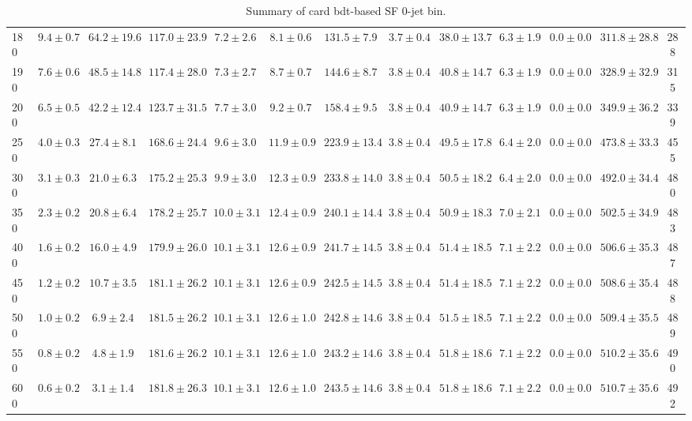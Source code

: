 \begin{table}
{\begin{center}
\begin{tabular}{l | c c | c c c c c c c c  | c c}
180 & $9.4\pm0.7$ & $64.2\pm19.6$ & $117.0\pm23.9$ & $7.2\pm2.6$ & $8.1\pm0.6$ & $131.5\pm7.9$ & $3.7\pm0.4$ & $38.0\pm13.7$ & $6.3\pm1.9$ & $0.0\pm0.0$ & $311.8\pm28.8$ & 288 \\
190 & $7.6\pm0.6$ & $48.5\pm14.8$ & $117.4\pm28.0$ & $7.3\pm2.7$ & $8.7\pm0.7$ & $144.6\pm8.7$ & $3.8\pm0.4$ & $40.8\pm14.7$ & $6.3\pm1.9$ & $0.0\pm0.0$ & $328.9\pm32.9$ & 315 \\
200 & $6.5\pm0.5$ & $42.2\pm12.4$ & $123.7\pm31.5$ & $7.7\pm3.0$ & $9.2\pm0.7$ & $158.4\pm9.5$ & $3.8\pm0.4$ & $40.9\pm14.7$ & $6.3\pm1.9$ & $0.0\pm0.0$ & $349.9\pm36.2$ & 339 \\
250 & $4.0\pm0.3$ & $27.4\pm8.1$ & $168.6\pm24.4$ & $9.6\pm3.0$ & $11.9\pm0.9$ & $223.9\pm13.4$ & $3.8\pm0.4$ & $49.5\pm17.8$ & $6.4\pm2.0$ & $0.0\pm0.0$ & $473.8\pm33.3$ & 455 \\
300 & $3.1\pm0.3$ & $21.0\pm6.3$ & $175.2\pm25.3$ & $9.9\pm3.0$ & $12.3\pm0.9$ & $233.8\pm14.0$ & $3.8\pm0.4$ & $50.5\pm18.2$ & $6.4\pm2.0$ & $0.0\pm0.0$ & $492.0\pm34.4$ & 480 \\
350 & $2.3\pm0.2$ & $20.8\pm6.4$ & $178.2\pm25.7$ & $10.0\pm3.1$ & $12.4\pm0.9$ & $240.1\pm14.4$ & $3.8\pm0.4$ & $50.9\pm18.3$ & $7.0\pm2.1$ & $0.0\pm0.0$ & $502.5\pm34.9$ & 483 \\
400 & $1.6\pm0.2$ & $16.0\pm4.9$ & $179.9\pm26.0$ & $10.1\pm3.1$ & $12.6\pm0.9$ & $241.7\pm14.5$ & $3.8\pm0.4$ & $51.4\pm18.5$ & $7.1\pm2.2$ & $0.0\pm0.0$ & $506.6\pm35.3$ & 487 \\
450 & $1.2\pm0.2$ & $10.7\pm3.5$ & $181.1\pm26.2$ & $10.1\pm3.1$ & $12.6\pm0.9$ & $242.5\pm14.5$ & $3.8\pm0.4$ & $51.4\pm18.5$ & $7.1\pm2.2$ & $0.0\pm0.0$ & $508.6\pm35.4$ & 488 \\
500 & $1.0\pm0.2$ & $6.9\pm2.4$ & $181.5\pm26.2$ & $10.1\pm3.1$ & $12.6\pm1.0$ & $242.8\pm14.6$ & $3.8\pm0.4$ & $51.5\pm18.5$ & $7.1\pm2.2$ & $0.0\pm0.0$ & $509.4\pm35.5$ & 489 \\
550 & $0.8\pm0.2$ & $4.8\pm1.9$ & $181.6\pm26.2$ & $10.1\pm3.1$ & $12.6\pm1.0$ & $243.2\pm14.6$ & $3.8\pm0.4$ & $51.8\pm18.6$ & $7.1\pm2.2$ & $0.0\pm0.0$ & $510.2\pm35.6$ & 490 \\
600 & $0.6\pm0.2$ & $3.1\pm1.4$ & $181.8\pm26.3$ & $10.1\pm3.1$ & $12.6\pm1.0$ & $243.5\pm14.6$ & $3.8\pm0.4$ & $51.8\pm18.6$ & $7.1\pm2.2$ & $0.0\pm0.0$ & $510.7\pm35.6$ & 492 \\
\hline
\end{tabular}
\end{center}
}
\caption{Summary of card bdt-based SF 0-jet bin.}
\end{table}
